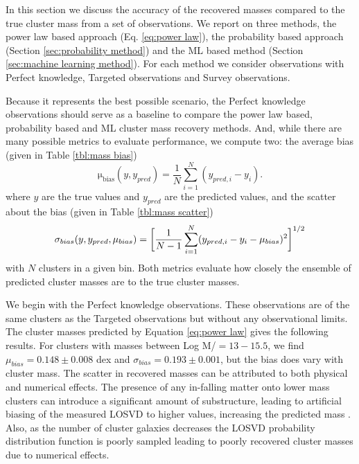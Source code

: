 \documentclass[fleqn,usenatbib]{mnras}
\begin{document}
In this section we discuss the accuracy of the recovered masses compared to the true cluster mass from a set of observations. We report on three methods, the power law based approach (Eq. \ref{eq:power law}), the probability based approach (Section \ref{sec:probability method}) and the ML based method (Section \ref{sec:machine learning method}). For each method we consider observations with Perfect knowledge, Targeted observations and Survey observations.

Because it represents the best possible scenario, the Perfect knowledge observations should serve as a baseline to compare the power law based, probability based and ML cluster mass recovery methods. And, while there are many possible metrics to evaluate performance, we compute two: the average bias (given in Table \ref{tbl:mass bias})
\begin{equation}\label{eqn: bias}
\mathrm{\mu_{bias}}(y,y_{pred}) = \frac{1}{N} \sum_{i=1}^N (y_{pred,i} - y_i).
\end{equation}
where $y$ are the true values and $y_{pred}$ are the predicted values, and the scatter about the bias (given in Table \ref{tbl:mass scatter})
\begin{equation}\label{eqn: scatter}
	\sigma_{bias}(y,y_{pred}, \mu_{bias}) = \bigg{[}\frac{1}{N-1} \sum_{i=1}^N (y_{pred,i} - y_i - \mu_{bias})^2 \bigg{]}^{1/2}
\end{equation}
with $N$ clusters in a given bin. Both metrics evaluate how closely the ensemble of predicted cluster masses are to the true cluster masses.

We begin with the Perfect knowledge observations. These observations are of the same clusters as the Targeted observations but without any observational limits. The cluster masses predicted by Equation \ref{eq:power law} gives the following results. For clusters with masses between Log M/\Msol $= 13 - 15.5$, we find $\mu_{bias} = 0.148\pm{0.008}$ dex and $\sigma_{bias} = 0.193\pm{0.001}$, but the bias does vary with cluster mass. The scatter in recovered masses can be attributed to both physical and numerical effects. The presence of any in-falling matter onto lower mass clusters can introduce a significant amount of substructure, leading to artificial biasing of the measured LOSVD to higher values, increasing the predicted mass . Also, as the number of cluster galaxies decreases the LOSVD probability distribution function is poorly sampled leading to poorly recovered cluster masses due to numerical effects. 
\end{document}
